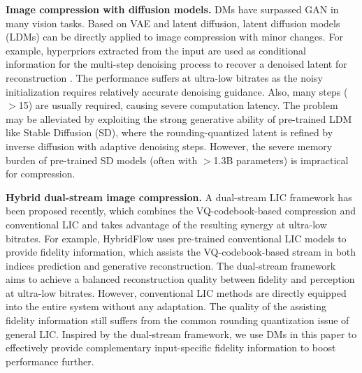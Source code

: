 \noindent \textbf{Image compression with diffusion models.}
DMs have surpassed GAN in many vision tasks. Based on VAE and latent diffusion, latent diffusion models (LDMs) can be directly applied to image compression with minor changes. For example, hyperpriors extracted from the input are used as conditional information for the multi-step denoising process to recover a denoised latent for reconstruction \cite{yang2024lossy}. The performance suffers at ultra-low bitrates as the noisy initialization requires relatively accurate denoising guidance. Also, many steps ($>$15) are usually required, causing severe computation latency. The problem may be alleviated by exploiting the strong generative ability of pre-trained LDM like Stable Diffusion (SD), where the rounding-quantized latent is refined by inverse diffusion \cite{relic2024lossy} with adaptive denoising steps. However, the severe memory burden of pre-trained SD models (often with $>$1.3B parameters) is impractical for compression.  

\noindent \textbf{Hybrid dual-stream image compression.}
A dual-stream LIC framework has been proposed recently, 
which combines the VQ-codebook-based compression and conventional LIC and takes advantage of the resulting synergy at ultra-low bitrates. For example, HybridFlow \cite{lu2024hybridflow} uses pre-trained conventional LIC models to provide fidelity information, which assists the VQ-codebook-based stream in both indices prediction and generative reconstruction. The dual-stream framework aims to achieve a balanced reconstruction quality between fidelity and perception at ultra-low bitrates. However, conventional LIC methods are directly equipped into the entire system without any adaptation. The quality of the assisting fidelity information still suffers from the common rounding quantization issue of general LIC. Inspired by the dual-stream framework, we use DMs in this paper to effectively provide complementary input-specific fidelity information to boost performance further.

